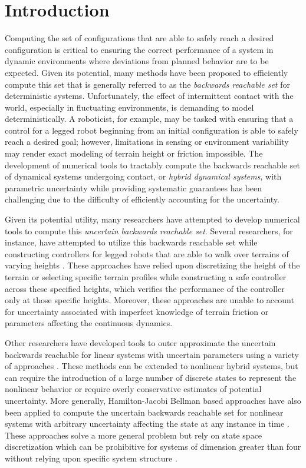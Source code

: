 \section{Introduction}
  
Computing the set of configurations that are able to safely reach a desired configuration is critical to ensuring the correct performance of a system in dynamic environments where deviations from planned behavior are to be expected.
Given its potential, many methods have been proposed to efficiently compute this set that is generally referred to as the \emph{backwards reachable set} for deterministic systems.
Unfortunately, the effect of intermittent contact with the world, especially in fluctuating environments, is demanding to model deterministically. 
A roboticist, for example, may be tasked with ensuring that a control for a legged robot beginning from an initial configuration is able to safely reach a desired goal; however, limitations in sensing or environment variability may render exact modeling of terrain height or friction impossible.
The development of numerical tools to tractably compute the backwards reachable set of dynamical systems undergoing contact, or \emph{hybrid dynamical systems}, with parametric uncertainty while providing systematic guarantees has been challenging due to the difficulty of efficiently accounting for the uncertainty.   

Given its potential utility, many researchers have attempted to develop numerical tools to compute this \emph{uncertain backwards reachable set}.
Several researchers, for instance, have attempted to utilize this backwards reachable set while constructing controllers for legged robots that are able to walk over terrains of varying heights \cite{byl2008metastable,dai2012optimizing,griffin2015,saglam2013switching}. 
These approaches have relied upon discretizing the height of the terrain or selecting specific terrain profiles while constructing a safe controller across these specified heights, which verifies the performance of the controller only at those specific heights.
Moreover, these approaches are unable to account for uncertainty associated with imperfect knowledge of terrain friction or parameters affecting the continuous dynamics.

Other researchers have developed tools to outer approximate the uncertain backwards reachable for linear systems with uncertain parameters using a variety of approaches \cite{girard2005reachability,althoff2008reachability}. 
These methods can be extended to nonlinear hybrid systems, but can require the introduction of a large number of discrete states to represent the nonlinear behavior or require overly conservative estimates of potential uncertainty. 
More generally, Hamilton-Jacobi Bellman based approaches have also been applied to compute the uncertain backwards reachable set for nonlinear systems with arbitrary uncertainty affecting the state at any instance in time \cite{tomlin2003computational}. 
These approaches solve a more general problem but rely on state space discretization which can be prohibitive for systems of dimension greater than four without relying upon specific system structure \cite{maidens2013lagrangian}.

